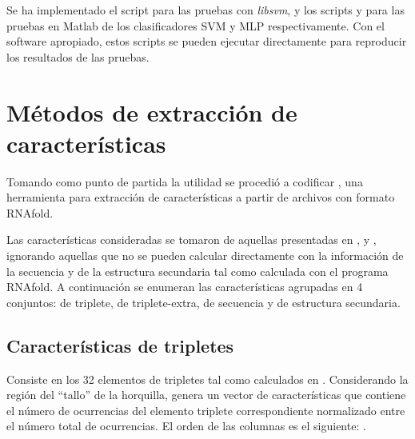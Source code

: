\documentclass[12pt,bibliography=oldstyle,DIV=12,parskip=half-,titlepage]{scrartcl}
\begin{document}
Se ha implementado el script  para las
pruebas con \emph{libsvm}, y los scripts  y
 para las pruebas en Matlab de los clasificadores
SVM y MLP respectivamente. Con el software apropiado, estos scripts
se pueden ejecutar directamente para reproducir los resultados de las
pruebas.
%
\section{Métodos de extracción de características}
%
Tomando como punto de partida la utilidad  se procedió
a codificar , una herramienta para extracción de
características a partir de archivos con formato RNAfold. 

Las características consideradas se tomaron de aquellas presentadas en
\cite{xue}, \cite{ng} y \cite{batuwita}, ignorando aquellas que
no se pueden calcular directamente con la información de la secuencia
y de la estructura secundaria tal como calculada con el programa
RNAfold. A continuación se enumeran las características agrupadas en 4
conjuntos: de triplete, de triplete-extra, de secuencia y de
estructura secundaria.
%
\subsection{Características de tripletes}
Consiste en los 32 elementos de tripletes tal como calculados en
\cite{xue}.  Considerando la región del ``tallo'' de la horquilla,
genera un vector de características que contiene el número de
ocurrencias del elemento triplete correspondiente normalizado entre el
número total de ocurrencias.  El orden de las columnas es el
siguiente: .
%
\end{document}
